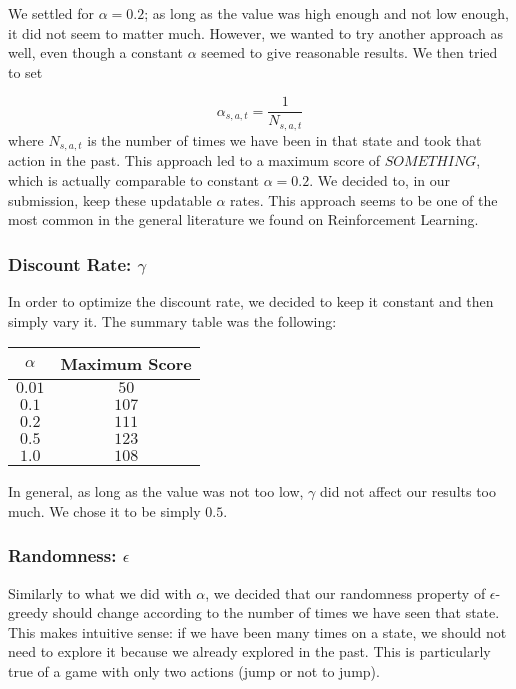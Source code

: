 \documentclass[10pt]{article}
\begin{document}
\medskip

We settled for $\alpha = 0.2$; as long as the value was high enough and not low
enough, it did not seem to matter much. However, we wanted to try another approach as well,
even though a constant $\alpha$ seemed to give reasonable results. We then tried to
set 

\[ \alpha_{s,a,t} = \frac{1}{N_{s,a,t}} \]
where $N_{s,a,t}$ is the number of times we have been in that state and took
that action in the past. This approach led to a maximum score of $SOMETHING$, which
is actually comparable to constant $\alpha = 0.2$. We decided to, in our submission,
keep these updatable $\alpha$ rates. This approach seems to be one of the most
common in the general literature we found on Reinforcement Learning.

\subsubsection{Discount Rate: $\gamma$}

In order to optimize the discount rate, we decided to keep it constant and then
simply vary it. The summary table was the following:

\medskip

\begin{center} 
\begin{tabular}{c|c} 
\hline
$\alpha$ & Maximum Score \\ \hline
$0.01$ & $50$ \\ \hline
$0.1$  &  $107$ \\ \hline 
$0.2$ & $111$ \\ \hline 
$0.5$ & $123$ \\ \hline 
$1.0$ & $108$ \\ \hline 
\end{tabular} 
\end{center}

\medskip

In general, as long as the value was not too low, $\gamma$ did not affect our
results too much. We chose it to be simply $0.5$.

\subsubsection{Randomness: $\epsilon$}

Similarly to what we did with $\alpha$, we decided that our randomness property
of $\epsilon$-greedy should change according to the number of times we have seen
that state. This makes intuitive sense: if we have been many times on a state, we should
not need to explore it because we already explored in the past. This is particularly true
of a game with only two actions (jump or not to jump).
\end{document}
